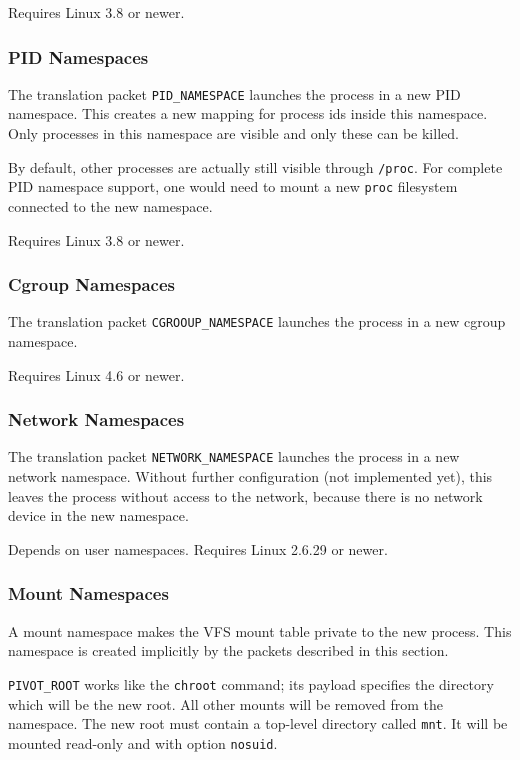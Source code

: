 \documentclass[a4paper,12pt]{article}
\begin{document}
Requires Linux 3.8 or newer.

\subsubsection{PID Namespaces}

The translation packet \verb|PID_NAMESPACE| launches the process in a
new PID namespace.  This creates a new mapping for process ids inside
this namespace.  Only processes in this namespace are visible and only
these can be killed.

By default, other processes are actually still visible through
\texttt{/proc}.  For complete PID namespace support, one would need to
mount a new \texttt{proc} filesystem connected to the new namespace.

Requires Linux 3.8 or newer.

\subsubsection{Cgroup Namespaces}

The translation packet \verb|CGROOUP_NAMESPACE| launches the process
in a new cgroup namespace.

Requires Linux 4.6 or newer.

\subsubsection{Network Namespaces}

The translation packet \verb|NETWORK_NAMESPACE| launches the process
in a new network namespace.  Without further configuration (not
implemented yet), this leaves the process without access to the
network, because there is no network device in the new namespace.

Depends on user namespaces.  Requires Linux 2.6.29 or newer.

\subsubsection{Mount Namespaces}

A mount namespace makes the VFS mount table private to the new
process.  This namespace is created implicitly by the packets
described in this section.

\verb|PIVOT_ROOT| works like the \texttt{chroot} command; its
payload specifies the directory which will be the new root.  All other
mounts will be removed from the namespace.  The new root must contain
a top-level directory called \texttt{mnt}.  It will be mounted
read-only and with option \texttt{nosuid}.
\end{document}
